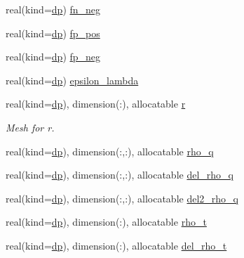 \begin{DoxyCompactItemize}
\item 
real(kind=\mbox{\hyperlink{namespaceparameters_a52f8c6351fd79345d8811e065bcbbb37}{dp}}) \mbox{\hyperlink{group__BSK__EXTRA__PARS_ga00dd6368c3084b28b39f9ca851465592}{fn\+\_\+neg}}
\item 
real(kind=\mbox{\hyperlink{namespaceparameters_a52f8c6351fd79345d8811e065bcbbb37}{dp}}) \mbox{\hyperlink{group__BSK__EXTRA__PARS_ga5e544dc32f83cdba34677a29c028ef40}{fp\+\_\+pos}}
\item 
real(kind=\mbox{\hyperlink{namespaceparameters_a52f8c6351fd79345d8811e065bcbbb37}{dp}}) \mbox{\hyperlink{group__BSK__EXTRA__PARS_ga6ed17804a32c9e04ddd4c244258b8610}{fp\+\_\+neg}}
\item 
real(kind=\mbox{\hyperlink{namespaceparameters_a52f8c6351fd79345d8811e065bcbbb37}{dp}}) \mbox{\hyperlink{group__BSK__EXTRA__PARS_ga383b5412e8499ce22ba113c539966123}{epsilon\+\_\+lambda}}
\item 
real(kind=\mbox{\hyperlink{namespaceparameters_a52f8c6351fd79345d8811e065bcbbb37}{dp}}), dimension(\+:), allocatable \mbox{\hyperlink{group__MESH_gab0ff28e85164200c8d56a8097bb2fe54}{r}}
\begin{DoxyCompactList}\small\item\em Mesh for r. \end{DoxyCompactList}\item 
real(kind=\mbox{\hyperlink{namespaceparameters_a52f8c6351fd79345d8811e065bcbbb37}{dp}}), dimension(\+:,\+:), allocatable \mbox{\hyperlink{group__DENSITIES_ga75b48fc89c0f01176fd8c58ced2979a8}{rho\+\_\+q}}
\item 
real(kind=\mbox{\hyperlink{namespaceparameters_a52f8c6351fd79345d8811e065bcbbb37}{dp}}), dimension(\+:,\+:), allocatable \mbox{\hyperlink{group__DENSITIES_ga8a7e7d5715287b287f2153291460783b}{del\+\_\+rho\+\_\+q}}
\item 
real(kind=\mbox{\hyperlink{namespaceparameters_a52f8c6351fd79345d8811e065bcbbb37}{dp}}), dimension(\+:,\+:), allocatable \mbox{\hyperlink{group__DENSITIES_ga9ccabc81160e04e43330cf8f61472f0e}{del2\+\_\+rho\+\_\+q}}
\item 
real(kind=\mbox{\hyperlink{namespaceparameters_a52f8c6351fd79345d8811e065bcbbb37}{dp}}), dimension(\+:), allocatable \mbox{\hyperlink{group__DENSITIES_gacd0134e8939522696ec62e629c100fd9}{rho\+\_\+t}}
\item 
real(kind=\mbox{\hyperlink{namespaceparameters_a52f8c6351fd79345d8811e065bcbbb37}{dp}}), dimension(\+:), allocatable \mbox{\hyperlink{group__DENSITIES_ga4d25fcfcb307d476b79d22bc2abe545b}{del\+\_\+rho\+\_\+t}}

\end{DoxyCompactItemize}
